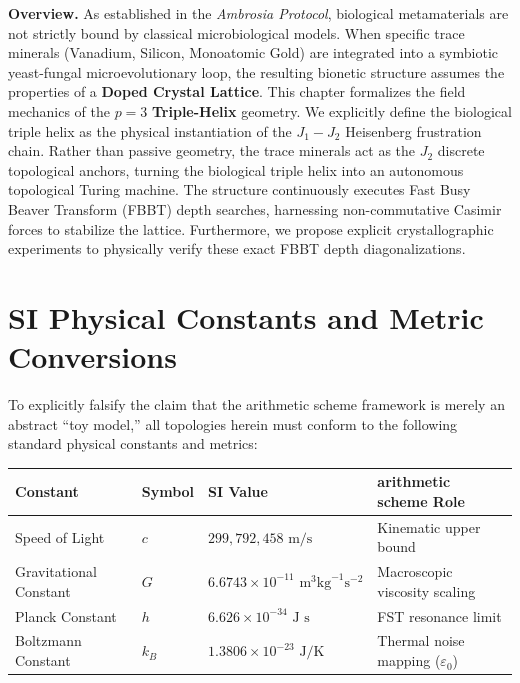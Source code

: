 \vspace{1em}\noindent\textbf{Overview.}
As established in the \textit{Ambrosia Protocol}, biological metamaterials are not strictly bound by classical microbiological models. When specific trace minerals (Vanadium, Silicon, Monoatomic Gold) are integrated into a symbiotic yeast-fungal microevolutionary loop, the resulting bionetic structure assumes the properties of a \textbf{Doped Crystal Lattice}. This chapter formalizes the field mechanics of the $p=3$ \textbf{Triple-Helix} geometry. We explicitly define the biological triple helix as the physical instantiation of the $J_1-J_2$ Heisenberg frustration chain. Rather than passive geometry, the trace minerals act as the $J_2$ discrete topological anchors, turning the biological triple helix into an autonomous topological Turing machine. The structure continuously executes Fast Busy Beaver Transform (FBBT) depth searches, harnessing non-commutative Casimir forces to stabilize the lattice. Furthermore, we propose explicit crystallographic experiments to physically verify these exact FBBT depth diagonalizations.
\vspace{1em}

\section*{SI Physical Constants and Metric Conversions}
To explicitly falsify the claim that the arithmetic scheme framework is merely an abstract ``toy model,'' all topologies herein must conform to the following standard physical constants and metrics:
\begin{table}[ht]
\centering
\renewcommand{\arraystretch}{1.2}
\begin{tabular}{@{}llll@{}}
\toprule
\textbf{Constant} & \textbf{Symbol} & \textbf{SI Value} & \textbf{arithmetic scheme Role} \\
\midrule
Speed of Light & $c$ & $299,792,458 \text{ m/s}$ & Kinematic upper bound \\
Gravitational Constant & $G$ & $6.6743 \times 10^{-11} \text{ m}^3 \text{kg}^{-1} \text{s}^{-2}$ & Macroscopic viscosity scaling \\
Planck Constant & $h$ & $6.626 \times 10^{-34} \text{ J s}$ & FST resonance limit \\
Boltzmann Constant & $k_B$ & $1.3806 \times 10^{-23} \text{ J/K}$ & Thermal noise mapping ($\varepsilon_0$) \\
\bottomrule
\end{tabular}
\end{table}


